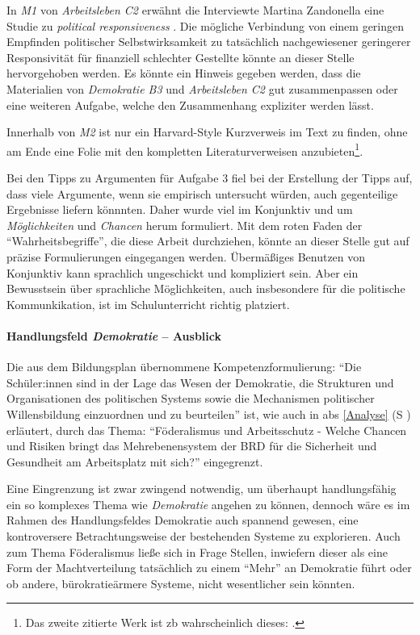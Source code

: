 In \emph{M1} von \emph{Arbeitsleben C2} erwähnt die Interviewte Martina Zandonella eine Studie zu \emph{political responsiveness} \autocite[]{Elsasser.2017}. Die mögliche Verbindung von einem geringen Empfinden politischer Selbstwirksamkeit zu tatsächlich nachgewiesener geringerer Responsivität für finanziell schlechter Gestellte \autocite{Elsasser.2017} könnte an dieser Stelle hervorgehoben werden. Es könnte ein Hinweis gegeben werden, dass die Materialien von \emph{Demokratie B3} und \emph{Arbeitsleben C2} gut zusammenpassen oder eine weiteren Aufgabe, welche den Zusammenhang expliziter werden lässt. 

Innerhalb von \emph{M2} ist nur ein Harvard-Style Kurzverweis im Text zu finden, ohne am Ende eine Folie mit den kompletten Literaturverweisen anzubieten\footnote{
    Das zweite zitierte Werk ist \gls{zb} wahrscheinlich dieses: \textcite[]{Probst.2022}.}. 

Bei den Tipps zu Argumenten für Aufgabe 3 fiel bei der Erstellung der Tipps auf, dass viele Argumente, wenn sie empirisch untersucht würden, auch gegenteilige Ergebnisse liefern könnnten. Daher wurde viel im Konjunktiv und um \emph{Möglichkeiten} und \emph{Chancen} herum formuliert. Mit dem roten Faden der \enquote{Wahrheitsbegriffe}, die diese Arbeit durchziehen, könnte an dieser Stelle gut auf präzise Formulierungen eingegangen werden.
Übermäßiges Benutzen von Konjunktiv kann sprachlich ungeschickt und kompliziert sein. Aber ein Bewusstsein über sprachliche Möglichkeiten, auch insbesondere für die politische Kommunkikation, ist im Schulunterricht richtig platziert. 



\paragraph{Handlungsfeld \emph{Demokratie} -- Ausblick \label{DemokratieAusblick}} %
Die aus dem Bildungsplan übernommene Kompetenzformulierung: \enquote{Die Schüler:innen sind in der Lage das Wesen der Demokratie, die Strukturen und Organisationen des politischen Systems sowie die Mechanismen politischer Willensbildung einzuordnen und zu beurteilen}
ist, wie auch in \gls{abs} \ref{Analyse} (\gls{S} \pageref{Analyse}) erläutert, durch das Thema: \enquote{Föderalismus und Arbeitsschutz - Welche Chancen und Risiken bringt das Mehrebenensystem der BRD für die Sicherheit und Gesundheit am Arbeitsplatz mit sich?} eingegrenzt. 

Eine Eingrenzung ist zwar zwingend notwendig, um überhaupt handlungsfähig ein so komplexes Thema wie \emph{Demokratie} angehen zu können, dennoch wäre es im Rahmen des Handlungsfeldes Demokratie auch spannend gewesen, eine kontroversere Betrachtungsweise der bestehenden Systeme zu explorieren. Auch zum Thema Föderalismus ließe sich in Frage Stellen, inwiefern dieser als eine Form der Machtverteilung tatsächlich zu einem \enquote{Mehr} an Demokratie führt oder ob andere, bürokratieärmere Systeme, nicht wesentlicher sein könnten. 

